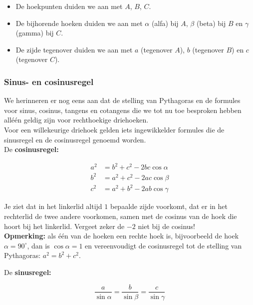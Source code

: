 \begin{itemize}
	\item De hoekpunten duiden we aan met $A$, $B$, $C$.
	\item De bijhorende hoeken duiden we aan met $\alpha$ (alfa) bij $A$, $\beta$ (beta) bij $B$ en $\gamma$ (gamma) bij $C$.
	\item De zijde tegenover duiden we aan met $a$ (tegenover $A$), $b$ (tegenover $B$) en $c$ (tegenover $C$).
\end{itemize}

\subsubsection{Sinus- en cosinusregel}

We herinneren er nog eens aan dat de stelling van Pythagoras en de formules voor sinus, cosinus, tangens en cotangens die we tot nu toe besproken hebben all\'{e}\'{e}n geldig zijn voor rechthoekige driehoeken.\\ Voor een willekeurige driehoek gelden iets ingewikkelder formules die de sinusregel en de cosinusregel genoemd worden.\\

De \textbf{cosinusregel:}

\begin{figure}[H]
	\centering 
	 
\end{figure}


\begin{align*}
a^2&= b^2+c^2-2bc\cos \alpha\\
b^2&=a^2 + c^2 - 2ac\cos \beta\\
c^2&= a^2 + b^2 -2ab \cos \gamma
\end{align*}

Je ziet dat in het linkerlid altijd $1$ bepaalde zijde voorkomt, dat er in het rechterlid de twee andere voorkomen, samen met de cosinus van de hoek die hoort bij het linkerlid. Vergeet zeker de $-2$ niet bij de cosinus!\\

{\bf Opmerking:} als \'{e}\'{e}n van de hoeken een rechte hoek is, bijvoorbeeld de hoek $\alpha=90^\circ$, dan is $\cos \alpha =1$ en vereenvoudigt de cosinusregel tot de stelling van Pythagoras: $a^2=b^2 +c^2$.

De \textbf{sinusregel:}

\[\frac{a}{\sin \alpha}=\frac{b}{\sin \beta}=\frac{c}{\sin \gamma}\]

